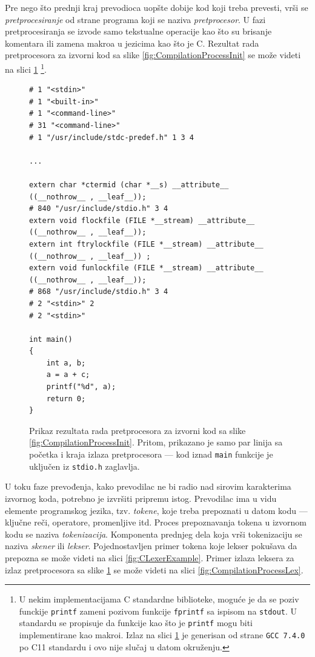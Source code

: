 Pre nego što prednji kraj prevodioca uopšte dobije kod koji treba prevesti, vrši se \emph{pretprocesiranje} od strane programa koji se naziva \emph{pretprocesor}. U fazi pretprocesiranja se izvode samo tekstualne operacije kao što su brisanje komentara ili zamena makroa u jezicima kao što je C. Rezultat rada pretprocesora za izvorni kod sa slike \ref{fig:CompilationProcessInit} se može videti na slici \ref{fig:CompilationProcessPrep} 
\footnote{U nekim implementacijama C standardne biblioteke, moguće je da se poziv funckije \texttt{printf} zameni pozivom funkcije \texttt{fprintf} sa ispisom na \texttt{stdout}. U standardu se propisuje da funkcije kao što je \texttt{printf} mogu biti implementirane kao makroi. Izlaz na slici \ref{fig:CompilationProcessPrep} je generisan od strane \texttt{GCC 7.4.0} po C11 standardu i ovo nije slučaj u datom okruženju.}.

\begin{figure}[h!]
\begin{lstlisting}
# 1 "<stdin>"
# 1 "<built-in>"
# 1 "<command-line>"
# 31 "<command-line>"
# 1 "/usr/include/stdc-predef.h" 1 3 4

...

extern char *ctermid (char *__s) __attribute__ ((__nothrow__ , __leaf__));
# 840 "/usr/include/stdio.h" 3 4
extern void flockfile (FILE *__stream) __attribute__ ((__nothrow__ , __leaf__));
extern int ftrylockfile (FILE *__stream) __attribute__ ((__nothrow__ , __leaf__)) ;
extern void funlockfile (FILE *__stream) __attribute__ ((__nothrow__ , __leaf__));
# 868 "/usr/include/stdio.h" 3 4
# 2 "<stdin>" 2
# 2 "<stdin>"

int main()
{
    int a, b;
    a = a + c;
    printf("%d", a);
    return 0;
}
\end{lstlisting}
\caption{Prikaz rezultata rada pretprocesora za izvorni kod sa slike \ref{fig:CompilationProcessInit}. Pritom, prikazano je samo par linija sa početka i kraja izlaza pretprocesora --- kod iznad \texttt{main} funkcije je uključen iz \texttt{stdio.h} zaglavlja.}
\label{fig:CompilationProcessPrep}
\end{figure}

U toku faze prevođenja, kako prevodilac ne bi radio nad sirovim karakterima izvornog koda, potrebno je izvršiti pripremu istog. Prevodilac ima u vidu elemente programskog jezika, tzv. \emph{tokene}, koje treba prepoznati u datom kodu --- ključne reči, operatore, promenljive itd. Proces prepoznavanja tokena u izvornom kodu se naziva \emph{tokenizacija}. Komponenta prednjeg dela koja vrši tokenizaciju se naziva \emph{skener} ili \emph{lekser}. Pojednostavljen primer tokena koje lekser pokušava da prepozna se može videti na slici \ref{fig:CLexerExample}. Primer izlaza leksera za izlaz pretprocesora sa slike \ref{fig:CompilationProcessPrep} se može videti na slici \ref{fig:CompilationProcessLex}.

